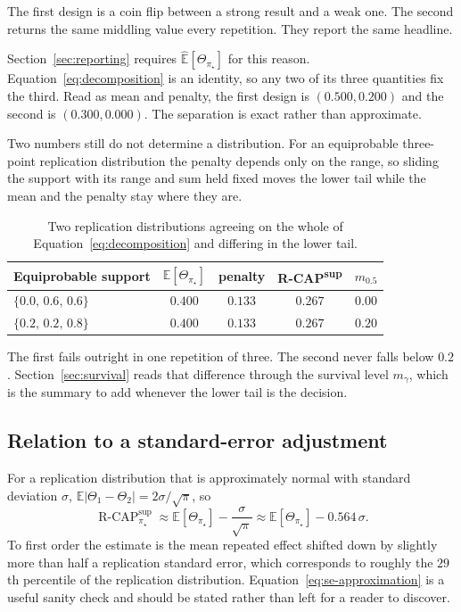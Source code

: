 \documentclass[11pt]{article}
\newcommand{\E}{\mathbb{E}}
\newcommand{\RCAP}{\operatorname{R\text{-}CAP}^{\mathrm{sup}}_{\pi_\star}}
\theoremstyle{remark}
\begin{document}
The first design is a coin flip between a strong result and a weak one. The second returns the same middling value every repetition. They report the same headline.

Section~\ref{sec:reporting} requires $\widehat{\E}[\Theta_{\pi_\star}]$ for this reason. Equation~\eqref{eq:decomposition} is an identity, so any two of its three quantities fix the third. Read as mean and penalty, the first design is $(0.500,0.200)$ and the second is $(0.300,0.000)$. The separation is exact rather than approximate.

Two numbers still do not determine a distribution. For an equiprobable three-point replication distribution the penalty depends only on the range, so sliding the support with its range and sum held fixed moves the lower tail while the mean and the penalty stay where they are.

\begin{table}[ht]
\centering
\caption{Two replication distributions agreeing on the whole of Equation~\eqref{eq:decomposition} and differing in the lower tail.}
\label{tab:collision-tail}
\begin{tabular}{@{}lcccc@{}}
\toprule
Equiprobable support & $\E[\Theta_{\pi_\star}]$ & penalty & R-CAP\textsuperscript{sup} & $m_{0.5}$ \\
\midrule
$\{0.0,\,0.6,\,0.6\}$ & $0.400$ & $0.133$ & $0.267$ & $0.00$ \\
$\{0.2,\,0.2,\,0.8\}$ & $0.400$ & $0.133$ & $0.267$ & $0.20$ \\
\bottomrule
\end{tabular}
\end{table}

The first fails outright in one repetition of three. The second never falls below $0.2$. Section~\ref{sec:survival} reads that difference through the survival level $m_\gamma$, which is the summary to add whenever the lower tail is the decision.

\subsection{Relation to a standard-error adjustment}

For a replication distribution that is approximately normal with standard deviation $\sigma$, $\E|\Theta_1-\Theta_2|=2\sigma/\sqrt{\pi}$, so
\begin{equation}
\RCAP
\approx
\E[\Theta_{\pi_\star}]-\frac{\sigma}{\sqrt{\pi}}
\approx
\E[\Theta_{\pi_\star}]-0.564\,\sigma .
\label{eq:se-approximation}
\end{equation}
To first order the estimate is the mean repeated effect shifted down by slightly more than half a replication standard error, which corresponds to roughly the $29$th percentile of the replication distribution. Equation~\eqref{eq:se-approximation} is a useful sanity check and should be stated rather than left for a reader to discover.
\end{document}
